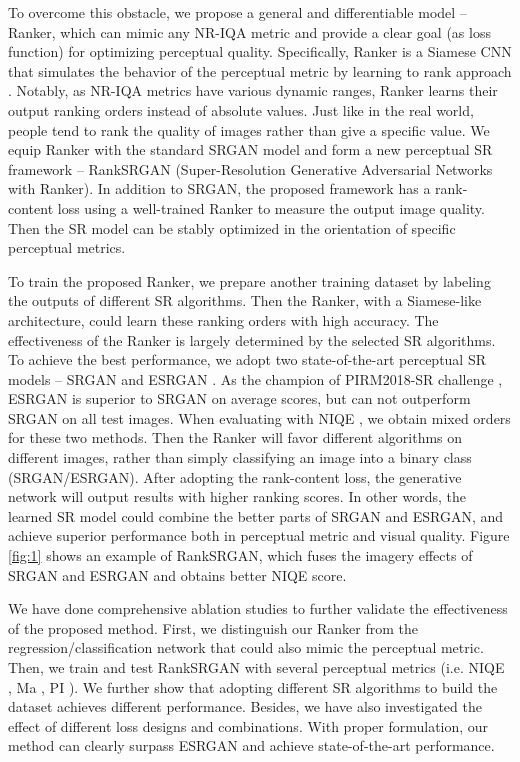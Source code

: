 \documentclass[10pt,twocolumn,letterpaper]{article}
\begin{document}
To overcome this obstacle, we propose a general and differentiable model -- Ranker, which can mimic any NR-IQA metric and provide a clear goal (as loss function) for optimizing perceptual quality. Specifically, Ranker is a Siamese CNN that simulates the behavior of the perceptual metric by learning to rank approach \cite{burges2005learning}. Notably, as NR-IQA metrics have various dynamic ranges, Ranker learns their output ranking orders instead of absolute values. Just like in the real world, people tend to rank the quality of images rather than give a specific value. We equip Ranker with the standard SRGAN model and form a new perceptual SR framework -- RankSRGAN (Super-Resolution Generative Adversarial Networks with Ranker). In addition to SRGAN, the proposed framework has a rank-content loss using a well-trained Ranker to measure the output image quality. Then the SR model can be stably optimized in the orientation of specific perceptual metrics.

To train the proposed Ranker, we prepare another training dataset by labeling the outputs of different SR algorithms. Then the Ranker, with a Siamese-like architecture, could learn these ranking orders with high accuracy. The effectiveness of the Ranker is largely determined by the selected SR algorithms. To achieve the best performance, we adopt two state-of-the-art perceptual SR models -- SRGAN \cite{ledig2017photo} and ESRGAN \cite{Wang_2018_ECCV_Workshops}. As the champion of PIRM2018-SR challenge \cite{blau20182018}, ESRGAN is superior to SRGAN on average scores, but can not outperform SRGAN on all test images. When evaluating with NIQE \cite{mittal2013making}, we obtain mixed orders for these two methods. Then the Ranker will favor different algorithms on different images, rather than simply classifying an image into a binary class (SRGAN/ESRGAN). After adopting the rank-content loss, the generative network will output results with higher ranking scores. In other words, the learned SR model could combine the better parts of SRGAN and ESRGAN, and achieve superior performance both in perceptual metric and visual quality. Figure \ref{fig:1} shows an example of RankSRGAN, which fuses the imagery effects of SRGAN and ESRGAN and obtains better NIQE score. 

We have done comprehensive ablation studies to further validate the effectiveness of the proposed method. First, we distinguish our Ranker from the regression/classification network that could also mimic the perceptual metric. Then, we train and test RankSRGAN with several perceptual metrics (i.e. NIQE \cite{mittal2013making}, Ma \cite{ma2017learning}, PI \cite{blau20182018}). We further show that adopting different SR algorithms to build the dataset achieves different performance. Besides, we have also investigated the effect of different loss designs and combinations. With proper formulation, our method can clearly surpass ESRGAN and achieve state-of-the-art performance. 
\end{document}
